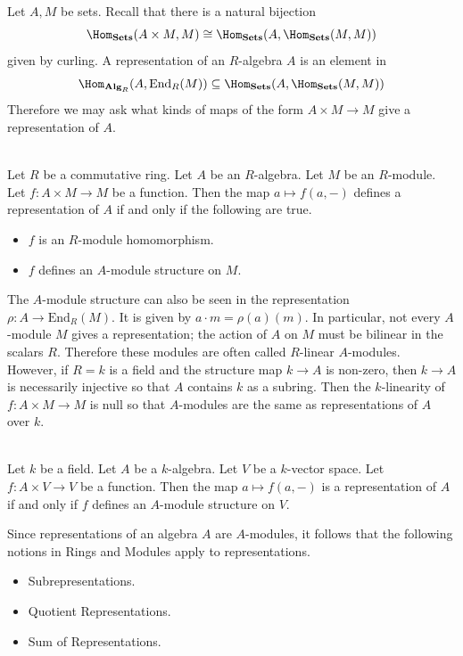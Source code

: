 \documentclass[a4paper]{article}
\begin{document}
Let $A,M$ be sets. Recall that there is a natural bijection $$\Hom_{\bold{Sets}}(A\times M,M)\cong\Hom_{\bold{Sets}}(A,\Hom_{\bold{Sets}}(M,M))$$ given by curling. A representation of an $R$-algebra $A$ is an element in $$\Hom_{\bold{Alg}_R}(A,\text{End}_R(M))\subseteq\Hom_{\bold{Sets}}(A,\Hom_{\bold{Sets}}(M,M))$$ Therefore we may ask what kinds of maps of the form $A\times M\to M$ give a representation of $A$. 

\begin{prp}{}{}\\
Let $R$ be a commutative ring. Let $A$ be an $R$-algebra. Let $M$ be an $R$-module. Let $f:A\times M\to M$ be a function. Then the map $a\mapsto f(a,-)$ defines a representation of $A$ if and only if the following are true. 
\begin{itemize}
\item $f$ is an $R$-module homomorphism. 
\item $f$ defines an $A$-module structure on $M$. 
\end{itemize}
\end{prp}

The $A$-module structure can also be seen in the representation $\rho:A\to\text{End}_R(M)$. It is given by $a\cdot m=\rho(a)(m)$. In particular, not every $A$-module $M$ gives a representation; the action of $A$ on $M$ must be bilinear in the scalars $R$. Therefore these modules are often called $R$-linear $A$-modules. \\

However, if $R=k$ is a field and the structure map $k\to A$ is non-zero, then $k\to A$ is necessarily injective so that $A$ contains $k$ as a subring. Then the $k$-linearity of $f:A\times M\to M$ is null so that $A$-modules are the same as representations of $A$ over $k$. 

\begin{crl}{}{}\\
Let $k$ be a field. Let $A$ be a $k$-algebra. Let $V$ be a $k$-vector space. Let $f:A\times V\to V$ be a function. Then the map $a\mapsto f(a,-)$ is a representation of $A$ if and only if $f$ defines an $A$-module structure on $V$. 
\end{crl}

Since representations of an algebra $A$ are $A$-modules, it follows that the following notions in Rings and Modules apply to representations. 
\begin{itemize}
\item Subrepresentations. 
\item Quotient Representations. 
\item Sum of Representations. 
\end{itemize}
\end{document}
